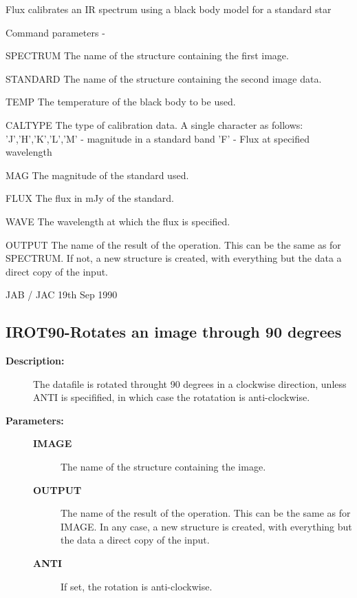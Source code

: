 \begin{description}
\begin{description}
\begin{terminalv}
 Flux calibrates an IR spectrum using a black body model for a
 standard star

 Command parameters -

 SPECTRUM  The name of the structure containing the first image.

 STANDARD  The name of the structure containing the second
           image data.

 TEMP      The temperature of the black body to be used.

 CALTYPE   The type of calibration data. A single character as follows:
              'J','H','K','L','M' - magnitude in a standard band
              'F' - Flux at specified wavelength

 MAG       The magnitude of the standard used.

 FLUX      The flux in mJy of the standard.

 WAVE      The wavelength at which the flux is specified.

 OUTPUT    The name of the result of the operation.  This can
           be the same as for SPECTRUM.  If not, a new structure
           is created, with everything but the data a direct
           copy of the input.

                                      JAB / JAC  19th Sep 1990
\end{terminalv}
\end{description}
\subsection{IROT90-\label{IROT90}Rotates an image through 90 degrees}
\begin{description}

\item [\textbf{Description:}]
 The datafile is rotated throught 90 degrees in a clockwise
 direction, unless ANTI is specifified, in which case the
 rotatation is anti-clockwise.

\item [\textbf{Parameters:}]
\begin{description}
\item [\textbf{IMAGE}]
 The name of the structure containing the image.
\item [\textbf{OUTPUT}]
 The name of the result of the operation.  This can be the same
 as  for IMAGE.  In any case, a new structure is created, with
 everything but the data a direct copy of the input.
\item [\textbf{ANTI}]
 If set, the rotation is anti-clockwise.
\end{description}


\end{description}
\end{description}
